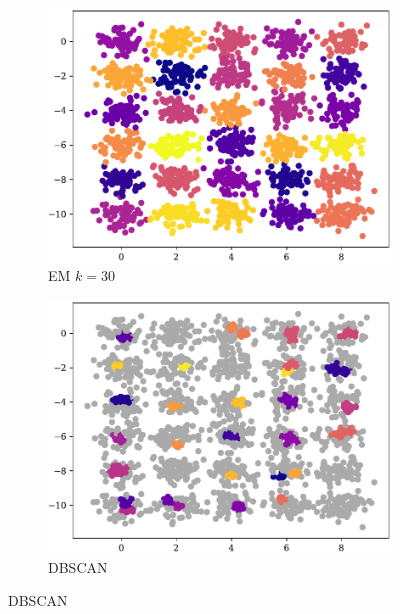 \begin{figure}[t!]
    \begin{subfigure}[b]{0.45\textwidth}
        \includegraphics[width=\textwidth]{../plots/30-30_pred_em.pdf}
        \caption{EM $k = 30$}
        \label{subfig:30-30-em}
    \end{subfigure}
    \hspace{0.09\textwidth}
    \begin{subfigure}[b]{0.45\textwidth}
        \includegraphics[width=\textwidth]{../plots/30-30_pred_dbscan.pdf}
        \caption{DBSCAN}
        \label{subfig:30-30-dbscan}
    \end{subfigure}
\end{figure}
